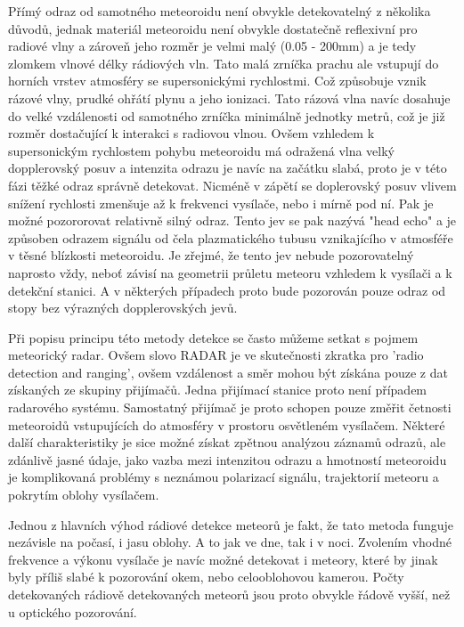 \documentclass[12pt,a4paper,oneside]{article}
\begin{document}
Přímý odraz od samotného meteoroidu není obvykle detekovatelný z několika důvodů, jednak materiál meteoroidu není obvykle dostatečně reflexivní pro radiové vlny a zároveň jeho rozměr je velmi malý (0.05 - 200mm) a je tedy zlomkem vlnové délky rádiových vln. Tato malá zrníčka prachu ale vstupují do horních vrstev atmosféry se supersonickými rychlostmi. Což způsobuje vznik rázové vlny, prudké ohřátí plynu a jeho ionizaci. Tato rázová vlna navíc dosahuje do velké vzdálenosti od samotného zrníčka minimálně jednotky metrů, což je již rozměr dostačující k interakci s radiovou vlnou. Ovšem vzhledem k supersonickým rychlostem pohybu meteoroidu má odražená vlna velký dopplerovský posuv a intenzita odrazu je navíc na začátku slabá, proto je v této fázi těžké odraz správně detekovat. Nicméně v zápětí se doplerovský posuv vlivem snížení rychlosti zmenšuje až k frekvenci vysílače, nebo i mírně pod ní. Pak je možné pozororovat relativně silný odraz. Tento jev se pak nazývá "head echo" a je způsoben odrazem signálu od čela plazmatického tubusu vznikajícího v atmosféře v těsné blízkosti meteoroidu. Je zřejmé, že tento jev nebude pozorovatelný naprosto vždy, neboť závisí na geometrii průletu meteoru vzhledem k vysílači a k detekční stanici. A v některých případech proto bude pozorován pouze odraz od stopy bez výrazných dopplerovských jevů. 

Při popisu principu této metody detekce se často můžeme setkat s pojmem meteorický radar.  Ovšem slovo RADAR je ve skutečnosti zkratka pro 'radio detection and ranging', ovšem vzdálenost a směr mohou být získána pouze z dat získaných ze skupiny přijímačů. Jedna přijímací stanice proto není případem radarového systému.  Samostatný přijímač je proto schopen pouze změřit četnosti meteoroidů vstupujících do atmosféry v prostoru osvětleném vysílačem. Některé další charakteristiky je sice možné získat zpětnou analýzou záznamů odrazů, ale zdánlivě jasné údaje, jako vazba mezi intenzitou odrazu a hmotností meteoroidu je komplikovaná problémy s neznámou polarizací signálu, trajektorií meteoru a pokrytím oblohy vysílačem.
    
Jednou z hlavních výhod rádiové detekce meteorů je fakt, že tato metoda funguje nezávisle na počasí, i jasu oblohy. A to jak ve dne, tak i v noci. Zvolením vhodné frekvence a výkonu vysílače je navíc možné detekovat i meteory, které by jinak byly příliš slabé k pozorování okem, nebo celooblohovou kamerou. Počty detekovaných rádiově detekovaných meteorů jsou proto obvykle řádově vyšší, než u optického pozorování. 
 
\end{document}
